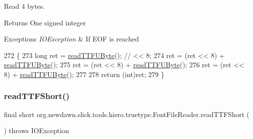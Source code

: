 Read 4 bytes.

\begin{DoxyReturn}{Returns}
One signed integer 
\end{DoxyReturn}

\begin{DoxyExceptions}{Exceptions}
{\em I\+O\+Exception} & If E\+OF is reached \\
\hline
\end{DoxyExceptions}

\begin{DoxyCode}
272                                                       \{
273         \textcolor{keywordtype}{long} ret = \mbox{\hyperlink{classorg_1_1newdawn_1_1slick_1_1tools_1_1hiero_1_1truetype_1_1_font_file_reader_af208587b367fbf19afbfd0cb584b7563}{readTTFUByte}}();    \textcolor{comment}{// << 8;}
274         ret = (ret << 8) + \mbox{\hyperlink{classorg_1_1newdawn_1_1slick_1_1tools_1_1hiero_1_1truetype_1_1_font_file_reader_af208587b367fbf19afbfd0cb584b7563}{readTTFUByte}}();
275         ret = (ret << 8) + \mbox{\hyperlink{classorg_1_1newdawn_1_1slick_1_1tools_1_1hiero_1_1truetype_1_1_font_file_reader_af208587b367fbf19afbfd0cb584b7563}{readTTFUByte}}();
276         ret = (ret << 8) + \mbox{\hyperlink{classorg_1_1newdawn_1_1slick_1_1tools_1_1hiero_1_1truetype_1_1_font_file_reader_af208587b367fbf19afbfd0cb584b7563}{readTTFUByte}}();
277 
278         \textcolor{keywordflow}{return} (\textcolor{keywordtype}{int})ret;
279     \}
\end{DoxyCode}
\mbox{\label{classorg_1_1newdawn_1_1slick_1_1tools_1_1hiero_1_1truetype_1_1_font_file_reader_a3a41dc0c99664d00bf0a42ec3d90e584}} 
\subsubsection{\texorpdfstring{read\+T\+T\+F\+Short()}{readTTFShort()}\hspace{0.1cm}{\footnotesize\ttfamily [1/2]}}
{\footnotesize\ttfamily final short org.\+newdawn.\+slick.\+tools.\+hiero.\+truetype.\+Font\+File\+Reader.\+read\+T\+T\+F\+Short (\begin{DoxyParamCaption}{ }\end{DoxyParamCaption}) throws I\+O\+Exception\hspace{0.3cm}{\ttfamily [inline]}}

